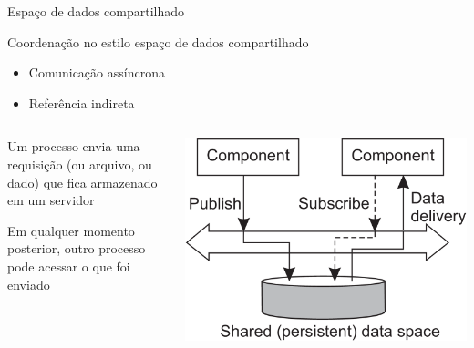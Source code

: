 \documentclass[compress]{beamer}
\begin{document}
\begin{frame}{Espaço de dados compartilhado}

Coordenação no estilo espaço de dados compartilhado
\begin{itemize}
    \item Comunicação assíncrona
    \item Referência indireta
\end{itemize}

\vspace{0.5cm}

\begin{columns}[T]
    \begin{column}{.45\textwidth}
        Um processo envia uma requisição (ou arquivo, ou dado) que fica armazenado em um servidor
        
        \vspace{0.5cm}
        
        Em qualquer momento posterior, outro processo pode acessar o que foi enviado 
    \end{column}
    \begin{column}{.54\textwidth}
        \centering\includegraphics[width=\textwidth]{images/dados_compartilhados.png}
    \end{column}
\end{columns}

\end{frame}

\end{document}
